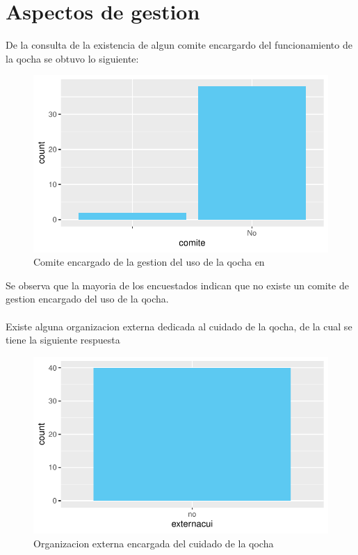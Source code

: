 \documentclass[12pt]{article}\usepackage[]{graphicx}\usepackage[]{xcolor}
\makeatletter
\def\maxwidth{ %
  \ifdim\Gin@nat@width>\linewidth
    \linewidth
  \else
    \Gin@nat@width
  \fi
}
\newenvironment{knitrout}{}{} %
\makeatother
\begin{document}
	\section{Aspectos de gestion}
	De la consulta de la existencia de algun comite encargardo del funcionamiento de la qocha se obtuvo lo siguiente:
	\begin{figure}[H]
	\centering
\begin{knitrout}
\color{fgcolor}
\includegraphics[width=\maxwidth]{figure/veintitres-1} 
\end{knitrout}
	\caption{Comite encargado de la gestion del uso de la qocha en \comunidad}
	\end{figure}
	Se observa que la mayoria de los encuestados indican que no existe un comite de gestion encargado del uso de la qocha.\\
	\\
	Existe alguna organizacion externa dedicada al cuidado de la qocha, de la cual se tiene la siguiente respuesta
	\begin{figure}[H]
	\centering
\begin{knitrout}
\color{fgcolor}
\includegraphics[width=\maxwidth]{figure/veintiseis-1} 
\end{knitrout}
	\caption{Organizacion externa encargada del cuidado de la qocha}
	\end{figure}
\end{document}
